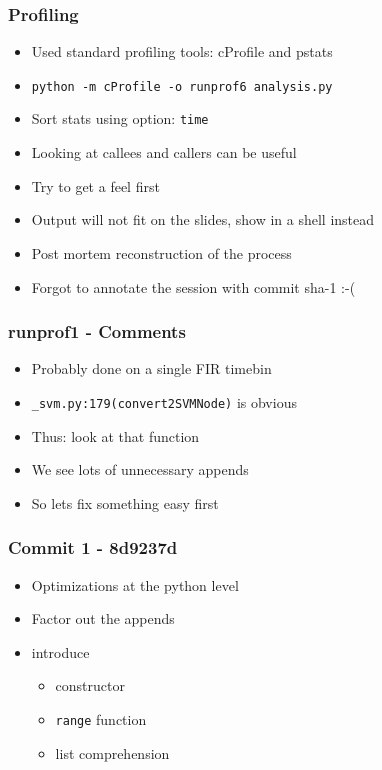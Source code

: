 \begin{frame}
 \frametitle{Profiling}
  


\begin{itemize}
  \item Used standard profiling tools: cProfile and pstats
  \item \texttt{python -m cProfile -o runprof6 analysis.py}
  \item Sort stats using option: \texttt{time}
  \item Looking at callees and callers can be useful
  \item Try to get a feel first
  \item Output will not fit on the slides, show in a shell instead
\end{itemize}

\begin{itemize}
  \item Post mortem reconstruction of the process
  \item Forgot to annotate the session with commit sha-1 :-(
\end{itemize}

  
 \end{frame}
\begin{frame}
 \frametitle{runprof1 - Comments}
  


\begin{itemize}
  \item Probably done on a single FIR timebin
  \item \texttt{\_svm.py:179(convert2SVMNode)} is obvious
  \item Thus: look at that function
  \item We see lots of unnecessary appends
  \item So lets fix something easy first
\end{itemize}

  
 \end{frame}
\begin{frame}
 \frametitle{Commit 1 - 8d9237d}
  


\begin{itemize}
  \item Optimizations at the python level
  \item Factor out the appends
  \item introduce
\begin{itemize}
  \item constructor
  \item \texttt{range} function
  \item list comprehension
\end{itemize}
\end{itemize}

  
 \end{frame}
